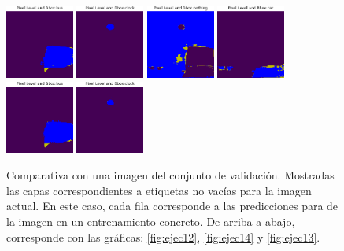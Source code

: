 \begin{figure}[h!]
  \vrule
  \includegraphics[width=0.2\textwidth]{../../modelos-entrenados/unet-conv-conv/ejecucion14/predvalmid6}
  \vrule
  \includegraphics[width=0.2\textwidth]{../../modelos-entrenados/unet-conv-conv/ejecucion14/predvalmid85}
  \vrule
  \includegraphics[width=0.2\textwidth]{../../modelos-entrenados/unet-semconv-conv/ejecucion13/predvalmid0}
  \vrule
  \includegraphics[width=0.2\textwidth]{../../modelos-entrenados/unet-semconv-conv/ejecucion13/predvalmid3}
  \vrule
  \includegraphics[width=0.2\textwidth]{../../modelos-entrenados/unet-semconv-conv/ejecucion13/predvalmid6}
  \vrule
  \includegraphics[width=0.2\textwidth]{../../modelos-entrenados/unet-semconv-conv/ejecucion13/predvalmid85}
  \caption{Comparativa con una imagen del conjunto de validación. Mostradas las capas correspondientes a etiquetas no vacías para la imagen actual. En este caso, cada fila corresponde a las predicciones para de la imagen en un entrenamiento concreto. De arriba a abajo, corresponde con las gráficas: \autoref{fig:ejec12}, \autoref{fig:ejec14} y \autoref{fig:ejec13}.}
  \label{fig:comparativa2-val}
\end{figure}

